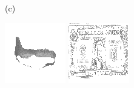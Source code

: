 \documentclass{article}
\begin{document}
\begin{figure}[t]
\begin{minipage}[c]{.21\linewidth}
  \end{minipage}
  \begin{minipage}[c]{.1\linewidth}
    \centering\centerline{(c)}
  \end{minipage}
  \begin{minipage}[c]{.21\linewidth}
    \centering\centerline{\includegraphics[width=\linewidth]{imgs/dennis_cal/airplane/sums/100_201.png}}
  \end{minipage}
  \begin{minipage}[c]{.21\linewidth}
    \centering\centerline{\includegraphics[width=\linewidth]{imgs/dennis_cal/dollar/sums/100_201.png}}

\end{minipage}
\end{figure}
\end{document}
